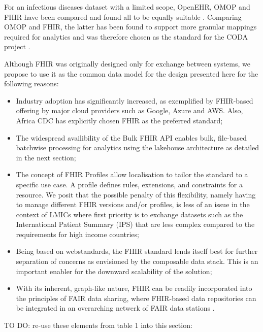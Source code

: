\documentclass[
  authoryear]{elsarticle}
\providecommand{\tightlist}{%
  \setlength{\itemsep}{0pt}\setlength{\parskip}{0pt}}\usepackage{longtable,booktabs,array}
\begin{document}
For an infectious diseases dataset with a limited scope, OpenEHR, OMOP
and FHIR have been compared and found all to be equally suitable
\citep{rinaldi2021openehr}. Comparing OMOP and FHIR, the latter has been
found to support more granular mappings required for analytics and was
therefore chosen as the standard for the CODA project
\citep{mullie2023coda}.

Although FHIR was originally designed only for exchange between systems,
we propose to use it as the common data model for the design presented
here for the following reasons:

\begin{itemize}
\tightlist
\item
  Industry adoption has significantly increased, as exemplified by
  FHIR-based offering by major cloud providers such as Google, Azure and
  AWS. Also, Africa CDC has explicitly chosen FHIR as the preferred
  standard;
\item
  The widespread availibility of the Bulk FHIR API
  \citep{mandl2020push, jones2021landscape} enables bulk, file-based
  batchwise processing for analytics using the lakehouse architecture as
  detailed in the next section;
\item
  The concept of FHIR Profiles allow localisation to tailor the standard
  to a specific use case. A profile defines rules, extensions, and
  constraints for a resource. We posit that the possible penalty of this
  flexibility, namely having to manage different FHIR versions and/or
  profiles, is less of an issue in the context of LMICs where first
  priority is to exchange datasets such as the International Patient
  Summary (IPS) that are less complex compared to the requirements for
  high income countries;
\item
  Being based on webstandards, the FHIR standard lends itself best for
  further separation of concerns as envisioned by the composable data
  stack. This is an important enabler for the downward scalability of
  the solution;
\item
  With its inherent, graph-like nature, FHIR can be readily incorporated
  into the principles of FAIR data sharing, where FHIR-based data
  repositories can be integrated in an overarching netwerk of FAIR data
  stations \citep{sinaci2023data, pedrera-jimenez2023can}.
\end{itemize}

TO DO: re-use these elements from table 1 into this section:
\end{document}
